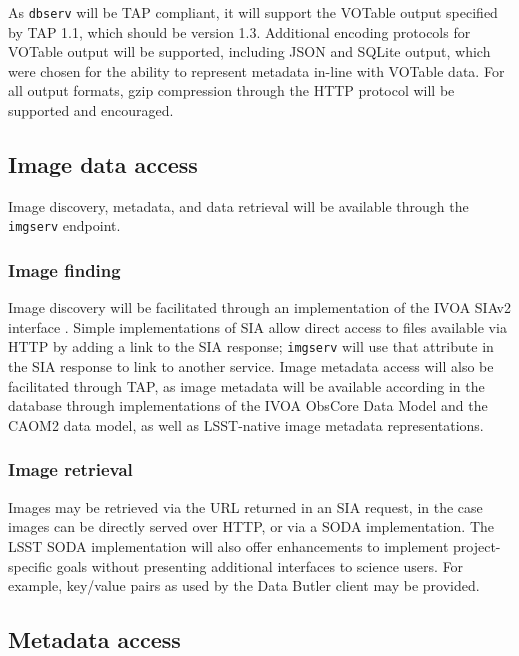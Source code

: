 As \texttt{dbserv} will be TAP compliant, it will support the VOTable output
specified by TAP 1.1, which should be version 1.3. Additional encoding
protocols for VOTable output will be supported, including JSON and SQLite
output, which were chosen for the ability to represent metadata in-line with
VOTable data. For all output formats, gzip compression through the HTTP
protocol will be supported and encouraged.

\subsection{Image data access}\label{image-data-access}

Image discovery, metadata, and data retrieval will be available through
the \texttt{imgserv} endpoint.

\subsubsection{Image finding}\label{image-finding}

Image discovery will be facilitated through an implementation of the IVOA 
SIAv2 interface \citep{2015ivoa.spec.1223D}.
Simple implementations of SIA allow direct access to files
available via HTTP by adding a link to the SIA response; \texttt{imgserv} will
use that attribute in the SIA response to link to another service.
Image metadata access will also be facilitated through TAP, as image metadata will be
available according in the database through implementations of the IVOA ObsCore
Data Model \citep{2017ivoa.spec.0509L} and the CAOM2 data model, as well as LSST-native
image metadata representations.

\subsubsection{Image retrieval}\label{image-retrieval}

Images may be retrieved via the URL returned in an SIA request, in the case
images can be directly served over HTTP, or via a SODA implementation. The LSST
SODA implementation will also offer enhancements to implement project-specific
goals without presenting additional interfaces to science users. For example,
key/value pairs as used by the Data Butler client may be provided.

\subsection{Metadata access}\label{metadata-access}

